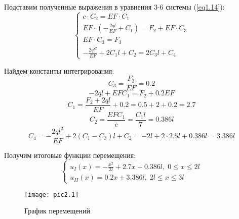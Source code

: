 Подставим полученные выражения в уравнения 3-6 системы (\ref{eq1.14}):
\begin{equation}
    \label{eq2.7}
    \begin{cases}
        c \cdot C_2 = EF \cdot C_1
        \\
        \displaystyle EF \cdot (- \frac{2ql}{EF} + C_1) = F_2 + EF \cdot C_3
        \\
        EF \cdot C_3 = F_3
        \\
        \displaystyle - \frac{2ql^2}{EF} + 2 C_1 l + C_2 = 2 C_3 l + C_4
    \end{cases}
\end{equation}

Найдем константы интегрирования:
\begin{equation}
    \label{eq2.8}
    C_3 = \frac{F_3}{EF} = 0.2
\end{equation}
\begin{equation}
    \label{eq2.9}
    - 2ql + EFC_1 = F_2 + 0.2EF
\end{equation}
\begin{equation}
    \label{eq2.10}
    C_1 = \frac{F_2 + 2ql}{EF} + 0.2 = 0.5 + 2 + 0.2 = 2.7
\end{equation}
\begin{equation}
    \label{eq2.11}
    C_2 = \frac{EFC_1}{c} = \frac{C_1 l}{7} = 0.386l
\end{equation}
\begin{equation}
    \label{eq2.12}
    C_4 = - \frac{2ql^2}{EF} + 2(C_1 - C_3)l + C_2 = - 2l + 2 \cdot 2.5 l + 0.386l = 3.386l
\end{equation}

Получим итоговые функции перемещения:
\begin{equation}
    \label{eq2.13}
    \begin{cases}
        \displaystyle u_{I} (x) =  - \frac{x^2}{2l} + 2.7x + 0.386l, \; 0 \leq x \leq 2l
        \\[10pt]
        \displaystyle u_{II} (x) = 0.2x + 3.386l, \; 2l \leq x \leq 3l
    \end{cases}
\end{equation}

\begin{figure}[H]
    \begin{center}
        \texttt{[image: pic2.1]}
        \caption{График перемещений}
        \label{pic2.1}
    \end{center}
\end{figure}

